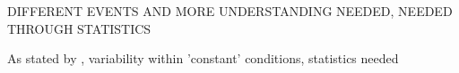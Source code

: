 \par 
DIFFERENT EVENTS AND MORE UNDERSTANDING NEEDED, NEEDED THROUGH STATISTICS

As stated by \cite{Bullock2007,Bogaert2010,Bredmose2009,Peregrine2003,Abdussamie2017}, variability within 'constant' conditions, statistics needed

\newpage 

